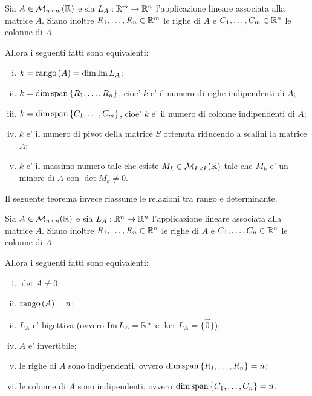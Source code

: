 \begin{theorem}\label{equivalenza_definizioni_di_rango}
    Sia $A \in \mathcal{M}_{n \times m}(\mathbb{R})$ e sia $L_A : \mathbb{R}^m \to \mathbb{R}^n$ l'applicazione lineare associata alla matrice $A$. Siano inoltre $R_1, \dots, R_n \in \mathbb{R}^m$ le righe di $A$ e $C_1, \dots, C_m \in \mathbb{R}^n$ le colonne di $A$. 
    
    Allora i seguenti fatti sono equivalenti:
    \begin{enumerate}
        [(i)]
        \item $k = \operatorname{rango}\left( A \right) = \dim \operatorname{Im}L_A$;
        \item $k = \dim \operatorname{span}\left\{R_1, \dots, R_n\right\}$, cioe' $k$ e' il numero di righe indipendenti di $A$;
        \item $k = \dim \operatorname{span}\left\{C_1, \dots, C_m\right\}$, cioe' $k$ e' il numero di colonne indipendenti di $A$;
        \item $k$ e' il numero di pivot della matrice $S$ ottenuta riducendo a scalini la matrice $A$;
        \item $k$ e' il massimo numero tale che esiste $M_k \in \mathcal{M}_{k \times k}(\mathbb{R})$ tale che $M_k$ e' un minore di $A$ con $\det M_k \neq 0$.
    \end{enumerate}
\end{theorem}

Il seguente teorema invece riassume le relazioni tra rango e determinante.

\begin{theorem}\label{relazioni_determinante_rango}
    Sia $A \in \mathcal{M}_{n \times n}(\mathbb{R})$ e sia $L_A : \mathbb{R}^n \to \mathbb{R}^n$ l'applicazione lineare associata alla matrice $A$. Siano inoltre $R_1, \dots, R_n \in \mathbb{R}^n$ le righe di $A$ e $C_1, \dots, C_n \in \mathbb{R}^n$ le colonne di $A$. 
    
    Allora i seguenti fatti sono equivalenti:
    \begin{enumerate}
        [(i)]
        \item $\det A \neq 0$;
        \item $\operatorname{rango}\left( A \right) = n$;
        \item $L_A$ e' bigettiva (ovvero $\operatorname{Im}L_A = \mathbb{R}^n$ e $\ker L_A = \{\vec 0\}$);
        \item $A$ e' invertibile;
        \item le righe di $A$ sono indipendenti, ovvero $\dim \operatorname{span}\left\{R_1, \dots, R_n\right\} = n$;
        \item le colonne di $A$ sono indipendenti, ovvero $\dim \operatorname{span}\left\{C_1, \dots, C_n\right\} = n$.
    \end{enumerate}
\end{theorem}
